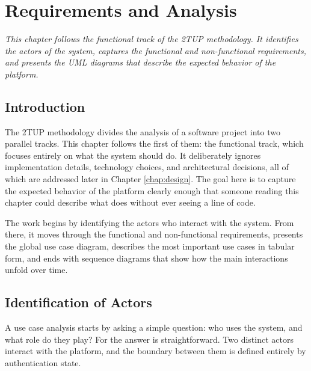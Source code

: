 
\chapter{Requirements and Analysis}
\label{chap:analysis}

\textit{This chapter follows the functional track of the 2TUP methodology. It identifies the actors of the system, captures the functional and non-functional requirements, and presents the UML diagrams that describe the expected behavior of the platform.}

\vspace{0.8cm}

\section{Introduction}

The 2TUP methodology divides the analysis of a software project into two parallel tracks. This chapter follows the first of them: the functional track, which focuses entirely on what the system should do. It deliberately ignores implementation details, technology choices, and architectural decisions, all of which are addressed later in Chapter \ref{chap:design}. The goal here is to capture the expected behavior of the platform clearly enough that someone reading this chapter could describe what \deepguard{} does without ever seeing a line of code.

The work begins by identifying the actors who interact with the system. From there, it moves through the functional and non-functional requirements, presents the global use case diagram, describes the most important use cases in tabular form, and ends with sequence diagrams that show how the main interactions unfold over time.

\section{Identification of Actors}

A use case analysis starts by asking a simple question: who uses the system, and what role do they play? For \deepguard{} the answer is straightforward. Two distinct actors interact with the platform, and the boundary between them is defined entirely by authentication state.

